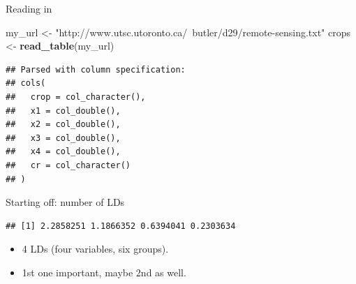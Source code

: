 \documentclass[
  ignorenonframetext,
]{beamer}
\newenvironment{Shaded}{\begin{snugshade}}{\end{snugshade}}
\newcommand{\DataTypeTok}[1]{\textcolor[rgb]{0.13,0.29,0.53}{#1}}
\newcommand{\KeywordTok}[1]{\textcolor[rgb]{0.13,0.29,0.53}{\textbf{#1}}}
\newcommand{\NormalTok}[1]{#1}
\newcommand{\OperatorTok}[1]{\textcolor[rgb]{0.81,0.36,0.00}{\textbf{#1}}}
\newcommand{\StringTok}[1]{\textcolor[rgb]{0.31,0.60,0.02}{#1}}
\begin{document}
\begin{frame}[fragile]{Reading in}
\protect\hypertarget{reading-in-1}{}

\small

\begin{Shaded}
\begin{Highlighting}[]
\NormalTok{my_url <-}\StringTok{ }
\StringTok{   "http://www.utsc.utoronto.ca/~butler/d29/remote-sensing.txt"}
\NormalTok{crops <-}\StringTok{ }\KeywordTok{read_table}\NormalTok{(my_url)}
\end{Highlighting}
\end{Shaded}

\begin{verbatim}
## Parsed with column specification:
## cols(
##   crop = col_character(),
##   x1 = col_double(),
##   x2 = col_double(),
##   x3 = col_double(),
##   x4 = col_double(),
##   cr = col_character()
## )
\end{verbatim}

\normalsize

\end{frame}

\begin{frame}[fragile]{Starting off: number of LDs}
\protect\hypertarget{starting-off-number-of-lds}{}

\begin{Shaded}
\end{Shaded}

\begin{verbatim}
## [1] 2.2858251 1.1866352 0.6394041 0.2303634
\end{verbatim}

\begin{itemize}
\item
  4 LDs (four variables, six groups).
\item
  1st one important, maybe 2nd as well.
\end{itemize}

\end{frame}
\end{document}
